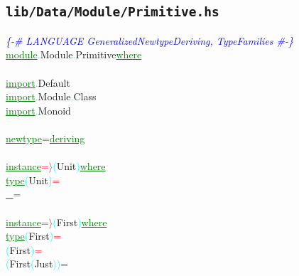 \subsection{\texttt{lib/Data/Module/Primitive.hs}}
\label{mod:Data.Module.Primitive}
\textcolor{blue}{{\it{}\{-\# LANGUAGE GeneralizedNewtypeDeriving, TypeFamilies \#-\}}}\\\textcolor{green}{\underline{module}}\textcolor{cyan}{.}{\rm{}Module}\textcolor{cyan}{.}{\rm{}Primitive}\hsspace \textcolor{green}{\underline{where}}\\\\\textcolor{green}{\underline{import}}\textcolor{cyan}{.}{\rm{}Default}\\\textcolor{green}{\underline{import}}\textcolor{cyan}{.}{\rm{}Module}\textcolor{cyan}{.}{\rm{}Class}\\\textcolor{green}{\underline{import}}\textcolor{cyan}{.}{\rm{}Monoid}\\\\\textcolor{green}{\underline{newtype}}\hsspace \textcolor{red}{=}\hsspace {\rm{}()}\hsspace \textcolor{green}{\underline{deriving}}\\\\\textcolor{green}{\underline{instance}}\hsspace \textcolor{red}{=\ensuremath{\rangle}}\hsspace \textcolor{cyan}{(}{\rm{}Unit}\textcolor{cyan}{)}\hsspace \textcolor{green}{\underline{where}}\\\hstab \textcolor{green}{\underline{type}}\hsspace \textcolor{cyan}{(}{\rm{}Unit}\textcolor{cyan}{)}\hsspace \textcolor{red}{=}\\\hsspace \textcolor{green}{\underline{\_}}\hsspace \textcolor{red}{=}\\\\\textcolor{green}{\underline{instance}}\hsspace \textcolor{red}{=\ensuremath{\rangle}}\hsspace \textcolor{cyan}{(}{\rm{}First}\textcolor{cyan}{)}\hsspace \textcolor{green}{\underline{where}}\\\hstab \textcolor{green}{\underline{type}}\hsspace \textcolor{cyan}{(}{\rm{}First}\textcolor{cyan}{)}\hsspace \textcolor{red}{=}\\\hsspace \textcolor{cyan}{(}{\rm{}First}\hsspace \hsspace \textcolor{cyan}{)}\hsspace \textcolor{red}{=}\\\hsspace \textcolor{cyan}{(}{\rm{}First}\hsspace \textcolor{cyan}{(}{\rm{}Just}\textcolor{cyan}{)}\textcolor{cyan}{)}\hsspace \textcolor{red}{=}\\
